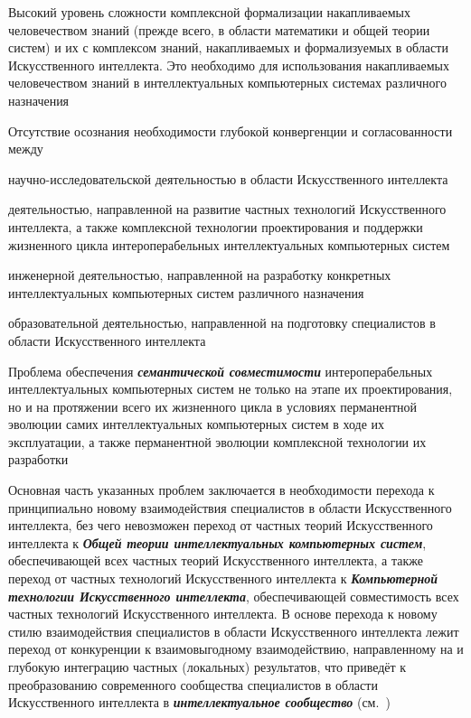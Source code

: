 \begin{textitemize}
	\item 
	Высокий уровень сложности комплексной формализации  накапливаемых человечеством знаний (прежде всего, в области математики и общей теории систем) и их  с комплексом знаний, накапливаемых и формализуемых в области Искусственного интеллекта. Это необходимо для  использования накапливаемых человечеством знаний в интеллектуальных компьютерных системах различного назначения
	\item 
	Отсутствие осознания необходимости глубокой конвергенции и согласованности между
	\begin{textitemize}
		\item научно-исследовательской деятельностью в области Искусственного интеллекта
		\item деятельностью, направленной на развитие частных технологий Искусственного интеллекта, а также комплексной технологии проектирования и поддержки жизненного цикла интероперабельных интеллектуальных компьютерных систем
		\item инженерной деятельностью, направленной на разработку конкретных интеллектуальных компьютерных систем различного назначения
		\item образовательной деятельностью, направленной на подготовку специалистов в области Искусственного интеллекта
	\end{textitemize}
	\item 
	Проблема обеспечения \textbf{\textit{семантической совместимости}} интероперабельных интеллектуальных компьютерных систем не только на этапе их проектирования, но и на протяжении всего их жизненного цикла в условиях перманентной эволюции самих интеллектуальных компьютерных систем в ходе их эксплуатации, а также перманентной эволюции комплексной технологии их разработки
\end{textitemize}

Основная часть указанных проблем заключается в необходимости перехода к принципиально новому   взаимодействия специалистов в области Искусственного интеллекта, без чего невозможен переход от частных теорий Искусственного интеллекта к \textbf{\textit{Общей теории интеллектуальных компьютерных систем}}, обеспечивающей  всех частных теорий Искусственного интеллекта, а также переход от частных технологий Искусственного интеллекта к \textbf{\textit{Компьютерной технологии Искусственного интеллекта}}, обеспечивающей совместимость всех частных технологий Искусственного интеллекта. В основе перехода к новому стилю взаимодействия специалистов в области Искусственного интеллекта лежит переход от конкуренции к  взаимовыгодному взаимодействию, направленному на  и глубокую интеграцию частных (локальных) результатов, что приведёт к преобразованию современного сообщества специалистов в области Искусственного интеллекта в \textbf{\textit{интеллектуальное сообщество}} (см.~\cite{Tarasov2002})

